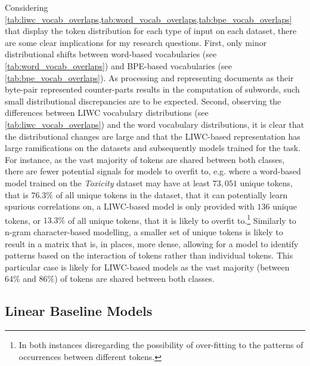 Considering \cref{tab:liwc_vocab_overlaps,tab:word_vocab_overlaps,tab:bpe_vocab_overlaps} that display the token distribution for each type of input on each dataset, there are some clear implications for my research questions.
First, only minor distributional shifts between word-based vocabularies (see \cref{tab:word_vocab_overlaps}) and BPE-based vocabularies (see \cref{tab:bpe_vocab_overlaps}). As processing and representing documents as their byte-pair represented counter-parts results in the computation of subwords, such small distributional discrepancies are to be expected.
Second, observing the differences between LIWC vocabulary distributions (see \cref{tab:liwc_vocab_overlaps}) and the word vocabulary distributions, it is clear that the distributional changes are large and that the LIWC-based representation has large ramifications on the datasets and subsequently models trained for the task.
For instance, as the vast majority of tokens are shared between both classes, there are fewer potential signals for models to overfit to, e.g. where a word-based model trained on the \textit{Toxicity} dataset may have at least $73,051$ unique tokens, that is $76.3\%$ of all unique tokens in the dataset, that it can potentially learn spurious correlations on, a LIWC-based model is only provided with $136$ unique tokens, or $13.3\%$ of all unique tokens, that it is likely to overfit to.\footnote{In both instances disregarding the possibility of over-fitting to the patterns of occurrences between different tokens.}
Similarly to n-gram character-based modelling, a smaller set of unique tokens is likely to result in a matrix that is, in places, more dense, allowing for a model to identify patterns based on the interaction of tokens rather than individual tokens. This particular case is likely for LIWC-based models as the vast majority (between $64\%$ and $86\%$) of tokens are shared between both classes.

\subsection{Linear Baseline Models}\label{sec:baseline_models}

